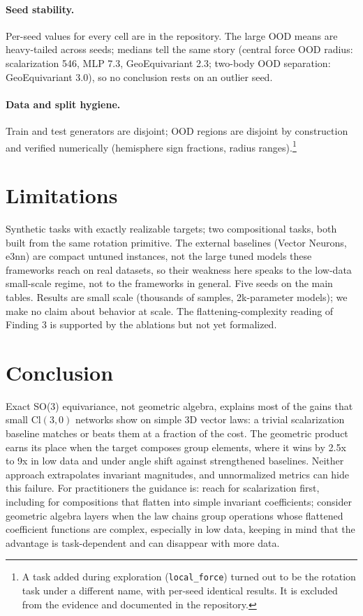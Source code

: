 \documentclass[11pt]{article}
\begin{document}
\paragraph{Seed stability.} Per-seed values for every cell are in the
repository. The large OOD means are heavy-tailed across seeds; medians tell
the same story (central force OOD radius: scalarization 546, MLP 7.3,
GeoEquivariant 2.3; two-body OOD separation: GeoEquivariant 3.0), so no
conclusion rests on an outlier seed.

\paragraph{Data and split hygiene.} Train and test generators are disjoint;
OOD regions are disjoint by construction and verified numerically (hemisphere
sign fractions, radius ranges).\footnote{A task added during exploration
(\texttt{local\_force}) turned out to be the rotation task under a different
name, with per-seed identical results. It is excluded from the evidence and
documented in the repository.}

\section{Limitations}
\label{sec:limitations}

Synthetic tasks with exactly realizable targets; two compositional tasks,
both built from the same rotation primitive. The external baselines (Vector
Neurons, e3nn) are compact untuned instances, not the large tuned models these
frameworks reach on real datasets, so their weakness here speaks to the
low-data small-scale regime, not to the frameworks in general. Five seeds on
the main tables. Results are small scale (thousands of samples, 2k-parameter
models); we make no claim about behavior at scale. The flattening-complexity
reading of Finding 3 is supported by the ablations but not yet formalized.

\section{Conclusion}

Exact SO(3) equivariance, not geometric algebra, explains most of the gains
that small $\mathrm{Cl}(3,0)$ networks show on simple 3D vector laws: a
trivial scalarization baseline matches or beats them at a fraction of the
cost. The geometric product earns its place when the target composes group
elements, where it wins by 2.5x to 9x in low data and under angle shift
against strengthened baselines. Neither approach extrapolates invariant
magnitudes, and unnormalized metrics can hide this failure. For practitioners
the guidance is: reach for scalarization first, including for compositions
that flatten into simple invariant coefficients; consider geometric algebra
layers when the law chains group operations whose flattened coefficient
functions are complex, especially in low data, keeping in mind that the
advantage is task-dependent and can disappear with more data.



\end{document}
